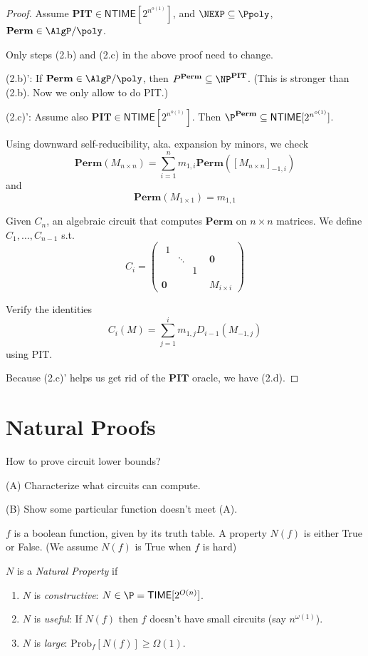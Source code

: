 \documentclass[letterpaper, 12pt]{article}
\newcommand{\Perm}{\mathbf{Perm}}
\newcommand{\PIT}{\mathbf{PIT}}
\newcommand{\Time}[1]{\mathsf{TIME}[#1]}
\newcommand{\NTime}[1]{\mathsf{NTIME}[#1]}
\newcommand{\Prob}[2]{\mathrm{Prob}_{#1}[#2]}
\newcommand{\subexp}{2^{n^{o(1)}}}
\begin{document}
\begin{proof}
	Assume $\PIT \in \NTime{\subexp}$, and $\NEXP \subseteq \Ppoly$, $\Perm \in \AlgP/\poly$.
	
	Only steps (2.b) and (2.c) in the above proof need to change.
	
	(2.b)': If $\Perm \in \AlgP/\poly$, then $P^\Perm \subseteq \NP^\PIT$. (This is stronger than (2.b). Now we only allow to do PIT.)
	
	(2.c)': Assume also $\PIT \in \NTime{\subexp}$. Then $\P^\Perm \subseteq \NTime{\subexp}$.
	
	Using downward self-reducibility, aka. expansion by minors, we check
	\[\Perm(M_{n\times n}) = \sum_{i = 1}^n m_{1,i} \Perm([M_{n\times n}]_{-1,i})\] 
	and
	\[\Perm(M_{1\times 1}) = m_{1,1}\]
	
	Given $C_n$, an algebraic circuit that computes $\Perm$ on $n \times n$ matrices. We define $C_1, \dots, C_{n-1}$ s.t. 
	\[C_i =
	\left(
	\begin{array}{cc}
	\begin{matrix}
	1 & &\\
	& \ddots &\\
	& & 1
	\end{matrix} & \mathbf{0}\\
	\mathbf{0} & M_{i\times i}
	\end{array}
	\right)
	 \]
	
	Verify the identities
	\[C_i(M) = \sum_{j = 1}^i m_{1,j} D_{i-1}(M_{-1,j})\]
	using PIT.
	
	Because (2.c)' helps us get rid of the $\PIT$ oracle, we have (2.d).
\end{proof}

\section{Natural Proofs}

How to prove circuit lower bounds?

(A) Characterize what circuits can compute.

(B) Show some particular function doesn't meet (A).

\begin{definition}
$f$ is a boolean function, given by its truth table.
A property $N(f)$ is either True or False. (We assume $N(f)$ is True when $f$ is hard)

$N$ is a \emph{Natural Property} if
\begin{enumerate}
	\item $N$ is \emph{constructive}: $N \in \P = \Time{2^{O(n)}}$.
	\item $N$ is \emph{useful}: If $N(f)$ then $f$ doesn't have small circuits (say $n^{\omega(1)}$).
	\item $N$ is \emph{large}: $\Prob{f}{N(f)} \geq \Omega(1)$.
\end{enumerate}
\end{definition}
\end{document}
